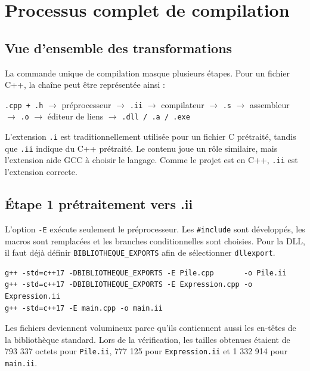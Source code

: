 \documentclass[11pt,a4paper]{article}
\newcommand{\fichier}[1]{\texttt{#1}}
\begin{document}
\section{Processus complet de compilation}

\subsection{Vue d'ensemble des transformations}

La commande unique de compilation masque plusieurs étapes. Pour un fichier C++, la chaîne peut être représentée ainsi :

\begin{center}
\fichier{.cpp + .h}
$\longrightarrow$ préprocesseur
$\longrightarrow$ \fichier{.ii}
$\longrightarrow$ compilateur
$\longrightarrow$ \fichier{.s}
$\longrightarrow$ assembleur
$\longrightarrow$ \fichier{.o}
$\longrightarrow$ éditeur de liens
$\longrightarrow$ \fichier{.dll / .a / .exe}
\end{center}

L'extension \fichier{.i} est traditionnellement utilisée pour un fichier C prétraité, tandis que \fichier{.ii} indique du C++ prétraité. Le contenu joue un rôle similaire, mais l'extension aide GCC à choisir le langage. Comme le projet est en C++, \fichier{.ii} est l'extension correcte.

\subsection{Étape 1 prétraitement vers .ii}

L'option \texttt{-E} exécute seulement le préprocesseur. Les \texttt{\#include} sont développés, les macros sont remplacées et les branches conditionnelles sont choisies. Pour la DLL, il faut déjà définir \texttt{BIBLIOTHEQUE\_EXPORTS} afin de sélectionner \texttt{dllexport}.

\begin{lstlisting}[style=console,caption={Prétraitement C++}]
g++ -std=c++17 -DBIBLIOTHEQUE_EXPORTS -E Pile.cpp       -o Pile.ii
g++ -std=c++17 -DBIBLIOTHEQUE_EXPORTS -E Expression.cpp -o Expression.ii
g++ -std=c++17 -E main.cpp -o main.ii
\end{lstlisting}

Les fichiers deviennent volumineux parce qu'ils contiennent aussi les en-têtes de la bibliothèque standard. Lors de la vérification, les tailles obtenues étaient de 793 337 octets pour \fichier{Pile.ii}, 777 125 pour \fichier{Expression.ii} et 1 332 914 pour \fichier{main.ii}.
\end{document}

